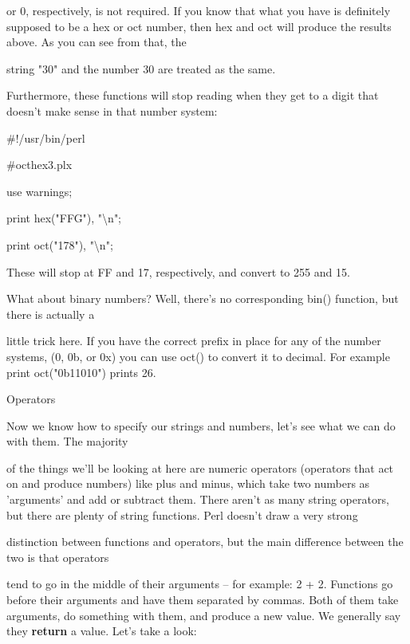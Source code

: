 \documentclass[a4paper,11pt]{book}
\begin{document}
\noindent or 0, respectively, is not required. If you know that what you have is definitely supposed to be a hex or oct number, then hex and oct will produce the results above. As you can see from that, the

\noindent string "30" and the number 30 are treated as the same.

\noindent 

\noindent Furthermore, these functions will stop reading when they get to a digit that doesn't make sense in that number system:

\noindent 

\noindent \#!/usr/bin/perl

\noindent \#octhex3.plx

\noindent use warnings;

\noindent print hex("FFG"), "\textbackslash n";

\noindent print oct("178"), "\textbackslash n";

\noindent 

\noindent These will stop at FF and 17, respectively, and convert to 255 and 15.

\noindent 

\noindent 

\noindent What about binary numbers? Well, there's no corresponding bin() function, but there is actually a

\noindent little trick here. If you have the correct prefix in place for any of the number systems, (0, 0b, or 0x) you can use oct() to convert it to decimal. For example print oct("0b11010") prints 26.

\noindent 

\noindent 

\noindent Operators

\noindent 

\noindent Now we know how to specify our strings and numbers, let's see what we can do with them. The majority

\noindent of the things we'll be looking at here are numeric operators (operators that act on and produce numbers) like plus and minus, which take two numbers as 'arguments' and add or subtract them. There aren't as many string operators, but there are plenty of string functions. Perl doesn't draw a very strong

\noindent distinction between functions and operators, but the main difference between the two is that operators

\noindent tend to go in the middle of their arguments -- for example: 2 + 2. Functions go before their arguments and have them separated by commas. Both of them take arguments, do something with them, and produce a new value. We generally say they \textbf{return }a value. Let's take a look:
\end{document}
